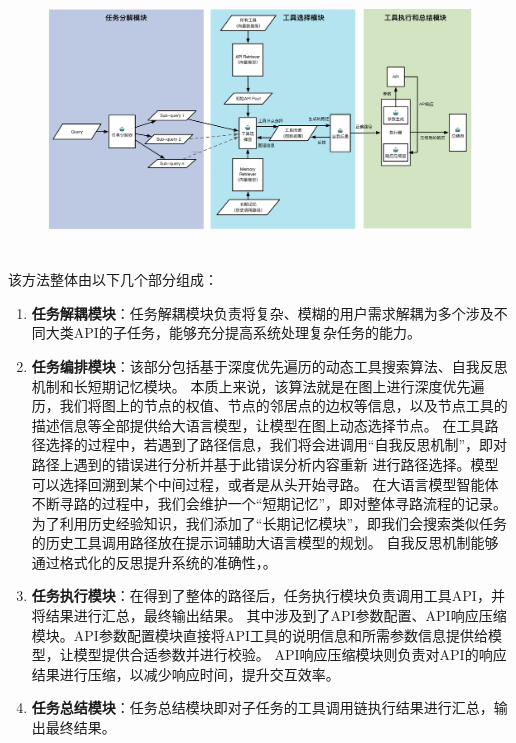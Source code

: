 \begin{figure}[!htp]
  \vspace{1em}
  \centering
  \setlength{\abovecaptionskip}{10pt} %
  \includegraphics[height=7cm]{../assets/ch4-整体框架图-3.pdf}
  \label{fig:ch4-framework}
\end{figure}

该方法整体由以下几个部分组成：

\begin{enumerate}
  \item \textbf{任务解耦模块}：任务解耦模块负责将复杂、模糊的用户需求解耦为多个涉及不同大类API的子任务，能够充分提高系统处理复杂任务的能力。
  \item \textbf{任务编排模块}：该部分包括基于深度优先遍历的动态工具搜索算法、自我反思机制和长短期记忆模块。
  本质上来说，该算法就是在图上进行深度优先遍历，我们将图上的节点的权值、节点的邻居点的边权等信息，以及节点工具的描述信息等全部提供给大语言模型，让模型在图上动态选择节点。
  在工具路径选择的过程中，若遇到了路径信息，我们将会进调用“自我反思机制”，即对路径上遇到的错误进行分析并基于此错误分析内容重新
  进行路径选择。模型可以选择回溯到某个中间过程，或者是从头开始寻路。
  在大语言模型智能体不断寻路的过程中，我们会维护一个“短期记忆”，即对整体寻路流程的记录。
  为了利用历史经验知识，我们添加了“长期记忆模块”，即我们会搜索类似任务的历史工具调用路径放在提示词辅助大语言模型的规划。
  自我反思机制能够通过格式化的反思提升系统的准确性，。
  \item \textbf{任务执行模块}：在得到了整体的路径后，任务执行模块负责调用工具API，并将结果进行汇总，最终输出结果。
  其中涉及到了API参数配置、API响应压缩模块。API参数配置模块直接将API工具的说明信息和所需参数信息提供给模型，让模型提供合适参数并进行校验。
  API响应压缩模块则负责对API的响应结果进行压缩，以减少响应时间，提升交互效率。
  \item \textbf{任务总结模块}：任务总结模块即对子任务的工具调用链执行结果进行汇总，输出最终结果。
\end{enumerate}

